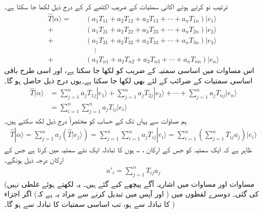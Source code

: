 ترتیب نو  کرتے ہوئے اکائی سمتیات کے  ضریب  اکٹھے کر کے درج ذیل لکھا جا سکتا ہے۔
\begin{align*}
\hat{T}|\alpha\rangle=\phantom{+}&(a_1T_{11}+a_2T_{12}+a_3T_{13}+\cdots+a_nT_{1n})|e_1\rangle\\
+&(a_1T_{21}+a_2T_{22}+a_3T_{23}+\cdots+a_nT_{2n})|e_2\rangle\\
+&(a_1T_{31}+a_2T_{32}+a_3T_{33}+\cdots+a_nT_{3n})|e_3\rangle\\
&\phantom{+}\vdots\\
+&(a_1T_{n1}+a_2T_{n2}+a_3T_{n3}+\cdots+a_nT_{nn})|e_n\rangle
\end{align*}
اس مساوات میں  اساسی سمتیہ  کے  ضریب      کو  لکھا جا سکتا ہے، اور اسی طرح باقی اساسی سمتیات کے ضرائب کے لئے بھی لکھا جا سکتا ہے۔یوں درج ذیل حاصل ہو گا۔
 \begin{align*}
\hat{T}|\alpha\rangle &=\sum_{j=1}^n a_j T_{1j}|e_1\rangle+\sum_{j=1}^n a_j T_{2j}|e_2\rangle+\cdots+\sum_{j=1}^n a_j T_{nj}|e_n\rangle\\
&=\sum_{i=1}^n  \sum_{j=1}^n a_j T_{ij}|e_i\rangle
\end{align*}
ہم مساوات  سے یہاں تک کے حساب کو مختصراً درج ذیل لکھ سکتے ہیں۔
\begin{align}\label{مساوات_ضمیمہ_خطی_تبادلہ_مختصر}
	\hat{T}|\alpha\rangle=\sum_{j=1}^{n}a_j\left(\hat{T}|e_j\rangle\right)=\sum_{j=1}^{n}\sum_{i=1}^{n}a_jT_{ij}|e_i\rangle=\sum_{i=1}^{n}\left(\sum_{j=1}^{n}T_{ij}a_j\right)|e_i\rangle
\end{align}
ظاہر ہے کہ  ایک سمتیہ کو جس کے ارکان ، ،،   ہوں کا تبادلہ  ایک نئے سمتیہ میں کرتا ہے جس کے ارکان درجہ ذیل ہونگے۔ 
\begin{align}\label{مساوات_ضمیمہ_تبادلہ_قائدہ}
	a'_i=\sum_{j=1}^{n}T_{ij}a_j
\end{align}
(مساوات  اور مساوات   میں اشاریہ آگے پیچھے کیے گئے ہیں۔ یہ لکھتے ہوئے غلطی نہیں کی گئی۔ دوسرے لفظوں میں  (   اور   آپس میں تبدیل کرنے  سے مراد یہ ہے کہ) اگر اجزاء کا تبادلہ   سے  ہو، تب اساسی سمتیات کا تبادلہ  سے  ہو گا۔  )

